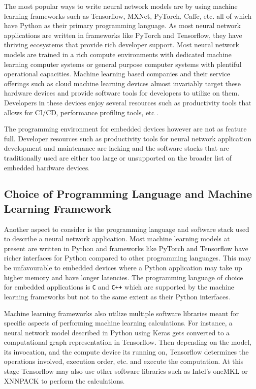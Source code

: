 The most popular ways to write neural network models are by using machine learning frameworks such as Tensorflow, MXNet, PyTorch, Caffe, etc. all of which have Python as their primary programming language. As most neural network applications are written in frameworks like PyTorch and Tensorflow, they have thriving ecosystems that provide rich developer support. Most neural network models are trained in a rich compute environments with dedicated machine learning computer systems or general purpose computer systems with plentiful operational capacities. Machine learning based companies and their service offerings such as cloud machine learning devices almost invariably target these hardware devices and provide software tools for developers to utilize on them. Developers in these devices enjoy several resources such as productivity tools that allows for CI/CD, performance profiling tools, etc \cite{Saucedo_Awesome_Production_Machine}.

The programming environment for embedded devices however are not as feature full. Developer resources such as productivity tools for neural network application development and maintenance are lacking and the software stacks that are traditionally used are either too large or unsupported on the broader list of embedded hardware devices.

\subsection{Choice of Programming Language and Machine Learning Framework}

Another aspect to consider is the programming language and software stack used to describe a neural network application. Most machine learning models at present are written in Python and frameworks like PyTorch and Tensorflow have richer interfaces for Python compared to other programming languages. This may be unfavourable to embedded devices where a Python application may take up higher memory and have longer latencies. The programming language of choice for embedded applications is \texttt{C} and \texttt{C++} which are supported by the machine learning frameworks but not to the same extent as their Python interfaces.

Machine learning frameworks also utilize multiple software libraries meant for specific aspects of performing machine learning calculations. For instance, a neural network model described in Python using Keras gets converted to a computational graph representation in Tensorflow. Then depending on the model, its invocation, and the compute device its running on, Tensorflow determines the operations involved, execution order, etc. and execute the computation. At this stage Tensorflow may also use other software libraries such as Intel's oneMKL \cite{oneMKL} or XNNPACK \cite{XNNPACK} to perform the calculations.

